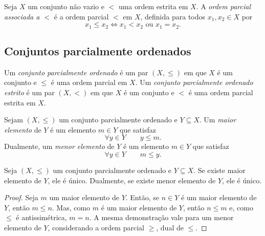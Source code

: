 \begin{definition}
	Seja $X$ um conjunto não vazio e $<$ uma ordem estrita em $X$. A \emph{ordem parcial associada a $<$} é a ordem parcial $<$ em $X$, definida para todos $x_1,x_2 \in X$ por
	\begin{equation*}
	x_1 \leq x_2 \Leftrightarrow x_1 < x_2 \text{\ \ ou\ \ } x_1 = x_2.
	\end{equation*}
\end{definition}

\subsection{Conjuntos parcialmente ordenados}

\begin{definition}
	Um \emph{conjunto parcialmente ordenado} é um par $(X,\leq)$ em que $X$ é um conjunto e $\leq$ é uma ordem parcial em $X$. Um \emph{conjunto parcialmente ordenado estrito} é um par $(X,<)$ em que $X$ é um conjunto e $<$ é uma ordem parcial estrita em $X$.
\end{definition}

\begin{definition}
	Sejam $(X,\leq)$ um conjunto parcialmente ordenado e $Y \subseteq X$. Um \emph{maior elemento} de $Y$ é um elemento $m \in Y$ que satisfaz
	\begin{equation*}
	\forall y \in Y \qquad y \leq m.
	\end{equation*}
Dualmente, um \emph{menor elemento} de $Y$ é um elemento $m \in Y$ que satisfaz
	\begin{equation*}
	\forall y \in Y \qquad m \leq y.
	\end{equation*}
\end{definition}

\begin{proposition}
	Seja $(X,\leq)$ um conjunto parcialmente ordenado e $Y \subseteq X$. Se existe maior elemento de $Y$, ele é único. Dualmente, se existe menor elemento de $Y$, ele é único.
\end{proposition}
\begin{proof}
	Seja $m$ um maior elemento de $Y$. Então, se $n \in Y$ é um maior elemento de $Y$, então $m \leq n$. Mas, como $m$ é um maior elemento de $Y$, então $n \leq m$ e, como $\leq$ é antissimétrica, $m=n$. A mesma demonstração vale para um menor elemento de $Y$, considerando a ordem parcial $\geq$, dual de $\leq$.
\end{proof}

